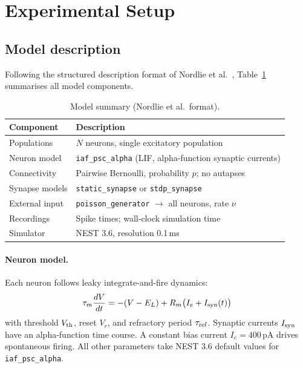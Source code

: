\documentclass[10pt,twocolumn]{article}
\begin{document}
\section{Experimental Setup}
\label{sec:methods}

\subsection{Model description}

Following the structured description format of Nordlie et al.\
\cite{nordlie2009}, Table~\ref{tab:model} summarises all model
components.

\begin{table}[h]
\caption{Model summary (Nordlie et al.\ format).}
\label{tab:model}
\small
\begin{tabular}{@{}ll@{}}
\hline
\textbf{Component} & \textbf{Description} \\
\hline
Populations    & $N$ neurons, single excitatory population \\
Neuron model   & \texttt{iaf\_psc\_alpha} (LIF, alpha-function
                 synaptic currents) \\
Connectivity   & Pairwise Bernoulli, probability $p$; no autapses \\
Synapse models & \texttt{static\_synapse} or \texttt{stdp\_synapse} \\
External input & \texttt{poisson\_generator} $\to$ all neurons,
                 rate $\nu$ \\
Recordings     & Spike times; wall-clock simulation time \\
Simulator      & NEST 3.6, resolution 0.1\,ms \\
\hline
\end{tabular}
\end{table}

\paragraph{Neuron model.}
Each neuron follows leaky integrate-and-fire dynamics:
\begin{equation}
  \tau_m \frac{dV}{dt} = -(V - E_L) + R_m\bigl(I_e + I_{\rm syn}(t)\bigr)
  \label{eq:lif}
\end{equation}
with threshold $V_{\rm th}$, reset $V_r$, and refractory period
$\tau_{\rm ref}$.
Synaptic currents $I_{\rm syn}$ have an alpha-function time course.
A constant bias current $I_e\!=\!400$\,pA drives spontaneous firing.
All other parameters take NEST 3.6 default values for
\texttt{iaf\_psc\_alpha}.
\end{document}
